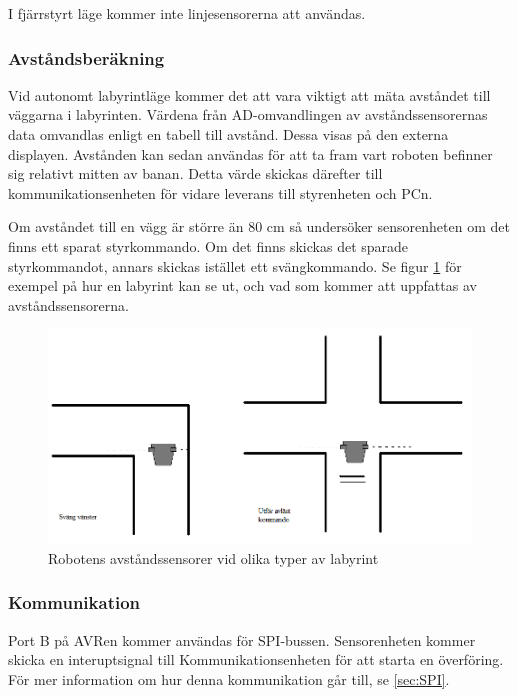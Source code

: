 I fjärrstyrt läge kommer inte linjesensorerna att användas.

\subsubsection{Avståndsberäkning}
Vid autonomt labyrintläge kommer det att vara viktigt att mäta avståndet till väggarna i labyrinten.
Värdena från AD-omvandlingen av avståndssensorernas data omvandlas enligt en tabell till avstånd. Dessa visas på den externa displayen. Avstånden kan sedan användas för att ta fram vart roboten befinner sig relativt mitten av banan. Detta värde skickas därefter till kommunikationsenheten för vidare leverans till styrenheten och PCn.

Om avståndet till en vägg är större än 80 cm så undersöker sensorenheten om det finns ett sparat styrkommando. Om det finns skickas det sparade styrkommandot, annars skickas istället ett svängkommando. Se  figur \ref{fig:labkors} för exempel på hur en labyrint kan se ut, och vad som kommer att uppfattas av avståndssensorerna. 

\begin{figure}[H]
\includegraphics[angle=0,scale=0.5]{bilder/labkors.png}
  \caption{Robotens avståndssensorer vid olika typer av labyrint}
  \label{fig:labkors}
\end{figure}

\subsubsection{Kommunikation}
Port B på AVRen kommer användas för SPI-bussen. Sensorenheten kommer skicka en interuptsignal till Kommunikationsenheten för att starta en överföring. För mer information om hur denna kommunikation går till, se \ref{sec:SPI}.

